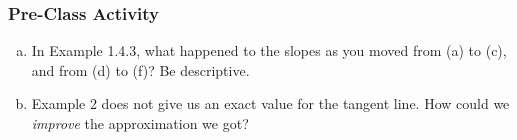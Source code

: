 \documentclass[notes]{subfiles}
\begin{document}
	\subsubsection*{Pre-Class Activity}
		\begin{ex}
			\begin{enumerate}[(a)]
				\item In Example 1.4.3, what happened to the slopes as you moved from (a) to (c), and from (d) to (f)?  Be descriptive.
					
				\item Example 2 does not give us an exact value for the tangent line.  How could we \emph{improve} the approximation we got?
			\end{enumerate}
		\end{ex}
		\newsec
		
\end{document}
